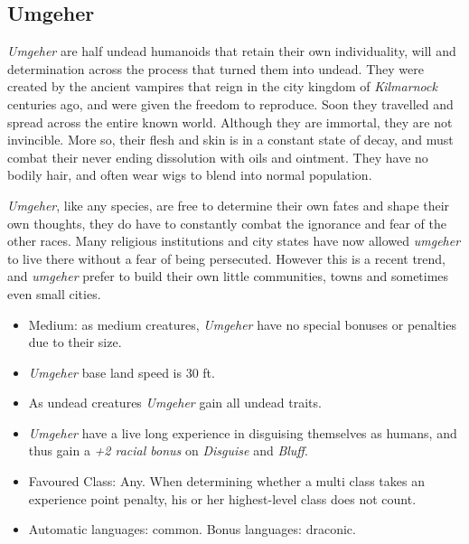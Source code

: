 
\subsection*{Umgeher}



\emph{Umgeher} are half undead humanoids that retain their own individuality,
will and determination across the process that turned them into undead. They
were created by the ancient vampires that reign in the city kingdom of
\emph{Kilmarnock} centuries ago, and were given the freedom to reproduce.
Soon they travelled and spread across the entire known world. Although they
are immortal, they are not invincible. More so, their flesh and skin is in a
constant state of decay, and must combat their never ending dissolution with
oils and ointment. They have no bodily hair, and often wear wigs to blend into
normal population.

\emph{Umgeher}, like any species, are free to determine their own fates and
shape their own thoughts, they do have to constantly combat the ignorance and
fear of the other races. Many religious institutions and city states have now
allowed \emph{umgeher} to live there without a fear of being persecuted.
However this is a recent trend, and \emph{umgeher} prefer to build their own
little communities, towns and sometimes even small cities.

\begin{35e}
  \begin{itemize}[noitemsep]
    \item Medium: as medium creatures, \emph{Umgeher} have no special bonuses or
    penalties due to their size.
    \item \emph{Umgeher} base land speed is 30 ft.
    \item As undead creatures \emph{Umgeher} gain all undead traits.
    \item \emph{Umgeher} have a live long experience in disguising themselves as
    humans, and thus gain a \emph{+2 racial bonus} on \emph{Disguise} and
    \emph{Bluff}.
    \item Favoured Class: Any. When determining whether a multi class takes an
    experience point penalty, his or her highest-level class does not count.
    \item Automatic languages: common. Bonus languages: draconic.
  \end{itemize}
\end{35e}

